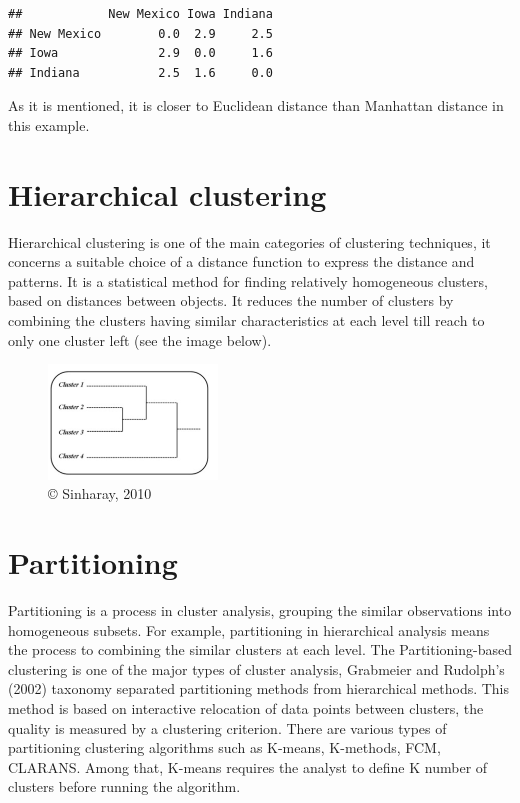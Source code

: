 \documentclass[]{book}
\begin{document}
\begin{verbatim}
##            New Mexico Iowa Indiana
## New Mexico        0.0  2.9     2.5
## Iowa              2.9  0.0     1.6
## Indiana           2.5  1.6     0.0
\end{verbatim}

As it is mentioned, it is closer to Euclidean distance than Manhattan distance in this example.

\hypertarget{hierarchical-clustering}{%
\section{Hierarchical clustering}\label{hierarchical-clustering}}

Hierarchical clustering is one of the main categories of clustering techniques, it concerns a suitable choice of a distance function to express the distance and patterns. It is a statistical method for finding relatively homogeneous clusters, based on distances between objects. It reduces the number of clusters by combining the clusters having similar characteristics at each level till reach to only one cluster left (see the image below).

\begin{figure}
\centering
\includegraphics[width=0.4\textwidth,height=\textheight]{Hierarchical.png}
\caption{© Sinharay, 2010}
\end{figure}

\hypertarget{partitioning}{%
\section{Partitioning}\label{partitioning}}

Partitioning is a process in cluster analysis, grouping the similar observations into homogeneous subsets. For example, partitioning in hierarchical analysis means the process to combining the similar clusters at each level.
The Partitioning-based clustering is one of the major types of cluster analysis, Grabmeier and Rudolph's (2002) taxonomy separated partitioning methods from hierarchical methods. This method is based on interactive relocation of data points between clusters, the quality is measured by a clustering criterion. There are various types of partitioning clustering algorithms such as K-means, K-methods, FCM, CLARANS.
Among that, K-means requires the analyst to define K number of clusters before running the algorithm.
\end{document}

